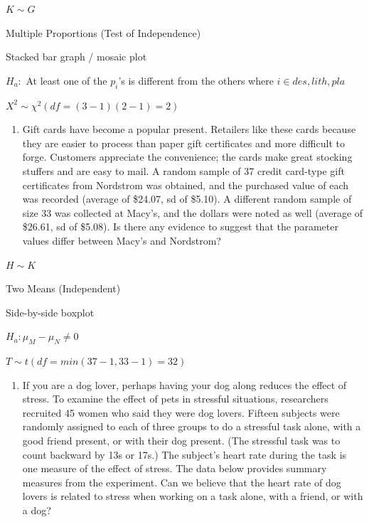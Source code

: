 \documentclass[]{article}
\providecommand{\tightlist}{%
  \setlength{\itemsep}{0pt}\setlength{\parskip}{0pt}}
\newenvironment{tight_enumerate}{ \begin{enumerate}[A)] \setlength{\itemsep}{0pt} \setlength{\parskip}{0pt}}{\end{enumerate}}
\begin{document}
\begin{tight_enumerate}
  \item $K \sim G$
  \item Multiple Proportions (Test of Independence)
  \item Stacked bar graph / mosaic plot
  \item $H_a:$ At least one of the $p_i$'s is different from the others where $i \in {des, lith, pla}$
  \item $X^2 \sim \chi^2 (df = (3 - 1)(2 - 1) = 2)$
\end{tight_enumerate}

\begin{enumerate}
\def\labelenumi{\arabic{enumi}.}
\setcounter{enumi}{5}
\tightlist
\item
  Gift cards have become a popular present. Retailers like these cards
  because they are easier to process than paper gift certificates and
  more difficult to forge. Customers appreciate the convenience; the
  cards make great stocking stuffers and are easy to mail. A random
  sample of 37 credit card-type gift certificates from Nordstrom was
  obtained, and the purchased value of each was recorded (average of
  \$24.07, sd of \$5.10). A different random sample of size 33 was
  collected at Macy's, and the dollars were noted as well (average of
  \$26.61, sd of \$5.08). Is there any evidence to suggest that the
  parameter values differ between Macy's and Nordstrom?
\end{enumerate}

\begin{tight_enumerate}
  \item $H \sim K$
  \item Two Means (Independent)
  \item Side-by-side boxplot
  \item $H_a: \mu_M - \mu_N \ne 0$
  \item $T \sim t(df = min(37 - 1, 33 - 1) = 32)$
\end{tight_enumerate}

\begin{enumerate}
\def\labelenumi{\arabic{enumi}.}
\setcounter{enumi}{6}
\tightlist
\item
  If you are a dog lover, perhaps having your dog along reduces the
  effect of stress. To examine the effect of pets in stressful
  situations, researchers recruited 45 women who said they were dog
  lovers. Fifteen subjects were randomly assigned to each of three
  groups to do a stressful task alone, with a good friend present, or
  with their dog present. (The stressful task was to count backward by
  13s or 17s.) The subject's heart rate during the task is one measure
  of the effect of stress. The data below provides summary measures from
  the experiment. Can we believe that the heart rate of dog lovers is
  related to stress when working on a task alone, with a friend, or with
  a dog?
\end{enumerate}
\end{document}
